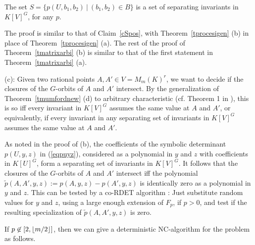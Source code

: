 \documentclass[11pt]{article}
\begin{document}
\begin{claim} 
The set $S=\{ p(U,b_1,b_2) \ | \ (b_1,b_2) \in B \}$ is a set of separating invariants in 
$K[V]^G$, for  any  $p$. 
\end{claim}

The proof is similar to that of Claim~\ref{cSpos}, with Theorem~\ref{tprocesigen} (b) 
in place of Theorem~\ref{tprocesigen} (a).
The rest of the proof of Theorem~\ref{tmatrixarbi} (b) 
is similar to that of the first statement in Theorem~\ref{tmatrixarbi} (a).


\noindent (c): Given two rational points $A, A' \in V=M_m(K)^r$, 
we want to decide if the closures of the $G$-orbits of $A$ and $A'$ 
intersect. By the generalization of Theorem~\ref{tmumfordnew} (d) to
arbitrary characteristic (cf. Theorem
1 in \cite{mumford}), this is so  iff every invariant in $K[V]^G$ assumes the same value at $A$ and $A'$, or
equivalently, if every  invariant in any separating set of invariants in $K[V]^G$ 
assumes the same value  at $A$ and $A'$.  

As noted in the proof of (b), 
the coefficients of the symbolic determinant  $p(U,y,z)$ in (\ref{eqpuyz}), considered as a polynomial in $y$ and $z$ with
coefficients in $K[U]^G$, form a separating set of invariants in  $K[V]^G$. 
It follows that the closures of the $G$-orbits of $A$ and $A'$ intersect iff 
the polynomial $\tilde p(A,A',y,z):=p(A,y,z) - p(A',y,z)$ is  identically zero as a polynomial in $y$ and $z$. 
This can be tested by a co-RDET algorithm \cite{ibarra}: Just  substitute random values for $y$
and $z$, using a large enough extension of $F_p$, if $p>0$, and test if the resulting specialization 
of $\tilde p(A,A',y,z)$ is zero. 

If $p \not \in [2,{\lfloor m/2 \rfloor}]$, then we can give a deterministic NC-algorithm for the problem as follows. 
\end{document}
